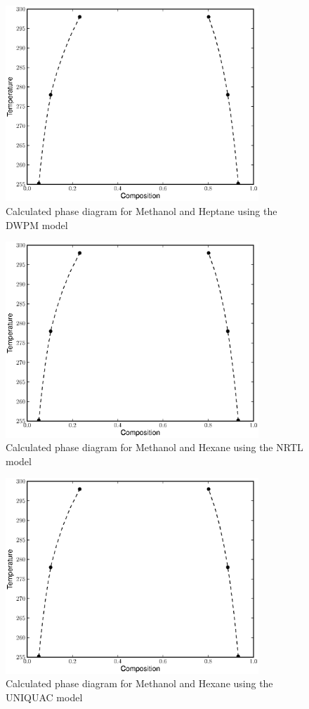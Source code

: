 \begin{figure}[hp]
\centering
\includegraphics[width = 0.85\textwidth]{Results_Parts/BinaryParams/methanol-hexane/DWPM/PhaseDiagram.eps}
\caption{Calculated phase diagram for Methanol and Heptane using the DWPM model} \label{DWPMmethanol-hexane}
\end{figure}

\begin{figure}[hp]
\centering
\includegraphics[width = 0.85\textwidth]{Results_Parts/BinaryParams/methanol-hexane/NRTL/PhaseDiagram.eps}
\caption{Calculated phase diagram for Methanol and Hexane using the NRTL model} \label{NRTLmethanol-hexane}
\end{figure}	

\begin{figure}[hp]
\centering
\includegraphics[width = 0.85\textwidth]{Results_Parts/BinaryParams/methanol-hexane/UNIQUAC/PhaseDiagram.eps}
\caption{Calculated phase diagram for Methanol and Hexane using the UNIQUAC model} \label{UNIQUACmethanol-hexane}
\end{figure}	

